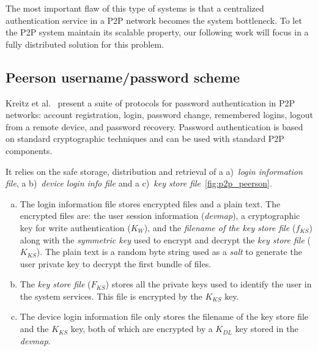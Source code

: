 The most important flaw of this type of systems is that a centralized authentication service in a P2P network becomes the system
bottleneck. To let the P2P system maintain its scalable property, our following work will focus in a
fully distributed solution for this problem.

\subsection{Peerson username/password scheme}

Kreitz et al.~\cite{kreitz2012passwords} present a suite of protocols for password
authentication in P2P networks: account registration, login, password change,
remembered logins, logout from a remote device, and password recovery.
Password authentication is based on standard cryptographic techniques and can
be used with standard P2P components. 

It relies on the safe storage, distribution and retrieval of a a)~\textit{login information
file}, a b)~\textit{device login info file} and a c)~\textit{key store
file}~\ref{fig:p2p_peerson}.

\begin{enumerate}[a)]

  \item The login information file stores encrypted files and a
plain text. The encrypted files are: the user session information (\textit{devmap}), a
cryptographic key for write authentication ($K_W$), and the \textit{filename of the
key store file} ($f_{KS}$) along with the \textit{symmetric key} used to encrypt and
decrypt the \textit{key store file} ($K_{KS}$). The plain text is a random byte string used as a \textit{salt} to generate the user private key to
decrypt the first bundle of files. 

  \item The \textit{key store file} ($F_{KS}$) stores all the private keys used to identify the
    user in the system services. This file is encrypted by the $K_{KS}$ key.

  \item The device login information file only stores the filename of the key
    store file and the $K_{KS}$ key, both of which are encrypted by a $K_{DL}$ key
    stored in the \textit{devmap}.
\end{enumerate}

